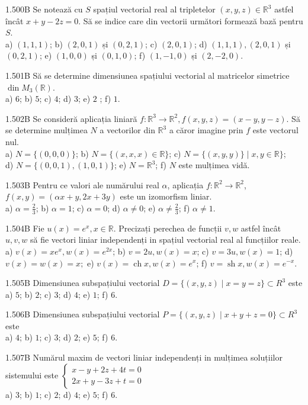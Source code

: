 \documentclass[11pt]{article}
\begin{document}
1.500B Se notează cu $S$ spațiul vectorial real al tripletelor $(x, y, z) \in \mathbb{R}^{3}$ astfel încât $x+y-2 z=0$. Să se indice care din vectorii următori formează bază pentru $S$.\\ a) $(1,1,1)$; b) $(2,0,1)$ și $(0,2,1)$; c) $(2,0,1)$; d) $(1,1,1),(2,0,1)$ și $(0,2,1)$; e) $(1,0,0)$ și $(0,1,0)$; f) $(1,-1,0)$ și $(2,-2,0)$.

1.501B Să se determine dimensiunea spațiului vectorial al matricelor simetrice $\operatorname{din} M_{3}(\mathbb{R})$.\\ a) $6$; b) $5$; c) $4$; d) $3$; e) $2$ ; f) $1$.

1.502B Se consideră aplicația liniară $f: \mathbb{R}^{3} \rightarrow \mathbb{R}^{2}, f(x, y, z)=(x-y, y-z)$. Să se determine mulțimea $N$ a vectorilor din $\mathbb{R}^{3}$ a căror imagine prin $f$ este vectorul nul.\\ a) $N=\{(0,0,0)\}$; b) $N=\{(x, x, x) \in \mathbb{R}\}$; c) $N=\{(x, y, y)\} \mid x, y \in \mathbb{R}\}$;\\ d) $N=\{(0,0,1),(1,0,1)\}$; e) $N=\mathbb{R}^{3}$; f) $N$ este mulțimea vidă.

1.503B Pentru ce valori ale numărului real $\alpha$, aplicația $f: \mathbb{R}^{2} \rightarrow \mathbb{R}^{2}$, $f(x, y)=(\alpha x+y, 2 x+3 y)$ este un izomorfism liniar.\\ a) $\alpha=\frac{2}{3}$; b) $\alpha=1$; c) $\alpha=0$; d) $\alpha \neq 0$; e) $\alpha \neq \frac{2}{3}$; f) $\alpha \neq 1$.

1.504B Fie $u(x)=e^{x}, x \in \mathbb{R}$. Precizați perechea de funcții $v, w$ astfel încât $u, v, w$ să fie vectori liniar independenți in spațiul vectorial real al funcțiilor reale.\\ a) $v(x)=x e^{x}, w(x)=e^{2 x}$; b) $v=2 u, w(x)=x$; c) $v=3 u, w(x)=1$; d) $v(x)=w(x)=x ;$ e) $v(x)=\operatorname{ch} x, w(x)=e^{x}$; f) $v=\operatorname{sh} x, w(x)=e^{-x}$.

1.505B Dimensiunea subspațiului vectorial $D=\{(x, y, z) \mid x=y=z\} \subset R^{3}$ este\\ a) $5$; b) $2$; c) $3$; d) $4$; e) $1$; f) $6$.

1.506B Dimensiunea subspațiului vectorial $P=\{(x, y, z) \mid x+y+z=0\} \subset R^{3}$ este\\ a) $4$; b) $1$; c) $3$; d) $2$; e) $5$; f) $6$.

1.507B Numărul maxim de vectori liniar independenți in mulțimea soluțiilor sistemului este $\left\{\begin{array}{l}x-y+2 z+4 t=0 \\ 2 x+y-3 z+t=0\end{array}\right.$\\ a) $3$; b) $1$; c) $2$; d) $4$; e) $5$; f) $6$.
\end{document}
